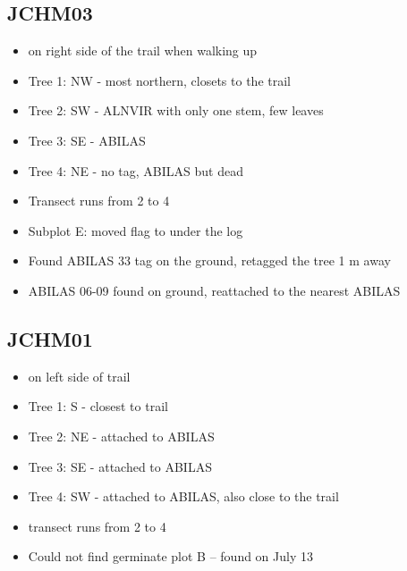 \documentclass{article}\usepackage[]{graphicx}\usepackage[]{color}
\begin{document}
\subsection{JCHM03}
\begin{itemize}
\item on right side of the trail when walking up
\item Tree 1: NW - most northern, closets to the trail  
\item Tree 2: SW - ALNVIR with only one stem, few leaves
\item Tree 3: SE - ABILAS
\item Tree 4: NE - no tag, ABILAS but dead
\item Transect runs from 2 to 4
\item Subplot E: moved flag to under the log
\item Found ABILAS 33 tag on the ground, retagged the tree 1 m away
\item ABILAS 06-09 found on ground, reattached to the nearest ABILAS
\end{itemize}

\subsection{JCHM01}
\begin{itemize}
\item on left side of trail
\item Tree 1: S - closest to trail
\item Tree 2: NE - attached to ABILAS
\item Tree 3: SE - attached to ABILAS
\item Tree 4: SW - attached to ABILAS, also close to the trail
\item transect runs from 2 to 4
\item Could not find germinate plot B -- found on July 13
\end{itemize}
\end{document}
